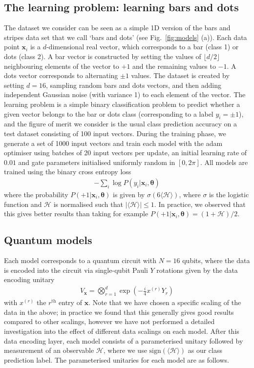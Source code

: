 \documentclass[a4paper,twocolumn,11pt]{quantumarticle}
\renewcommand{\vec}{\boldsymbol}
\begin{document}
\subsection{The learning problem: learning bars and dots}
The dataset we consider can be seen as a simple 1D version of the bars and stripes data set that we call `bars and dots' (see Fig.\ \ref{fig:models} (a)). Each data point $\vec{x}_i$ is a $d$-dimensional real vector, which corresponds to a bar (class 1) or dots (class 2). A bar vector is constructed by setting the values of $\lfloor d/2 \rfloor$ neighbouring elements of the vector to $+1$ and the remaining values to $-1$. A dots vector corresponds to alternating $\pm1$ values. The dataset is created by setting $d=16$, sampling random bars and dots vectors, and then adding independent Gaussian noise (with variance 1) to each element of the vector. The learning problem is a simple binary classification problem to predict whether a given vector belongs to the bar or dots class (corresponding to a label $y_i=\pm1$), and the figure of merit we consider is the usual class prediction accuracy on a test dataset consisting of 100 input vectors. During the training phase, we generate a set of 1000 input vectors and train each model with the adam optimiser using batches of 20 input vectors per update, an initial learning rate of $0.01$ and gate parameters initialised uniformly random in $[0,2\pi]$. All models are trained using the binary cross entropy loss
%
\begin{align}
    - \sum_i \log P(y_i\vert \vec{x}_i, \vec{\theta})
\end{align}
%
where the probability $P(+1\vert \vec{x}_i, \vec{\theta})$ is given by $\sigma(6\langle \mathcal{H} \rangle)$, where $\sigma$ is the logistic function and $\mathcal{H}$ is normalised such that $\vert\langle \mathcal{H} \rangle\vert\leq 1 $. In practice, we observed that this gives better results than taking for example $P(+1\vert \vec{x}_i, \vec{\theta})=(1+\mathcal{H})/2$. 

\subsection{Quantum models}
Each model corresponds to a quantum circuit with $N=16$ qubits, where the data is encoded into the circuit via single-qubit Pauli $Y$ rotations given by the data encoding unitary
%
\begin{align}
    V_{\vec{x}} = \bigotimes_{r=1}^d 
    \exp\left(-\frac{i}{4}x^{(r)} Y_r\right)
\end{align}
%
with $x^{(r)}$ the $r^{\text{th}}$ entry of $\vec{x}$. Note that we have chosen a specific scaling of the data in the above; in practice we found that this generally gives good results compared to other scalings, however we have not performed a detailed investigation into the effect of different data scalings on each model. After this data encoding layer, each model consists of a parameterised unitary followed by measurement of an observable $\mathcal{H}$, where we use $\text{sign}(\langle\mathcal{H}\rangle)$ as our class prediction label. The parameterised unitaries for each model are as follows. 
\end{document}
